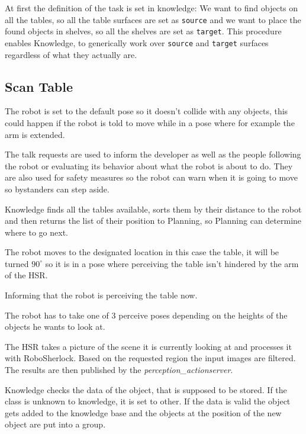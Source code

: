 \documentclass[main.tex]{subfiles}
\begin{document}
	At first the definition of the task is set in knowledge: We want to find objects on all the tables, so all the table surfaces are set as \texttt{source} and we want to place the found objects in shelves, so all the shelves are set as \texttt{target}. This procedure enables Knowledge, to generically work over \texttt{source} and \texttt{target} surfaces regardless of what they actually are.
	
	\subsection{Scan Table}
	
	The robot is set to the default pose so it doesn't collide with any objects, this could happen if the robot is told to move while in a pose where for example the arm is extended.
	
	
	The talk requests are used to inform the developer as well as the people following the robot or evaluating its behavior about what the robot is about to do. They are also used for safety measures so the robot can warn when it is going to move so bystanders can step aside. 
	
	Knowledge finds all the tables available, sorts them by their distance to the robot and then returns the list of their position to Planning, so Planning can determine where to go next.
	
	The robot moves to the designated location in this case the table, it will be turned $90^\circ$ so it is in a pose where perceiving the table isn't hindered by the arm of the HSR. 
	
	Informing that the robot is perceiving the table now.
	
	The robot has to take one of 3 perceive poses depending on the heights of the objects he wants to look at.
	
	The HSR takes a picture of the scene it is currently looking at and processes it with RoboSherlock. Based on the requested region the input images are filtered. The results are then published by the \textit{perception\_actionserver}.
	
	Knowledge checks the data of the object, that is supposed to be stored. If the class is unknown to knowledge, it is set to other. If the data is valid the object gets added to the knowledge base and the objects at the position of the new object are put into a group.
	
\end{document}
